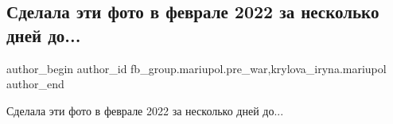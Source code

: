  
 
 
 
 

\subsection{Сделала эти фото в феврале 2022 за несколько дней до...}
\label{sec:11_02_2023.fb.fb_group.mariupol.pre_war.4.sdelala_eti_foto_v_f}
 
\ifcmt
 author_begin
   author_id fb_group.mariupol.pre_war,krylova_iryna.mariupol
 author_end
\fi

Сделала эти фото в феврале 2022 за несколько дней до...

